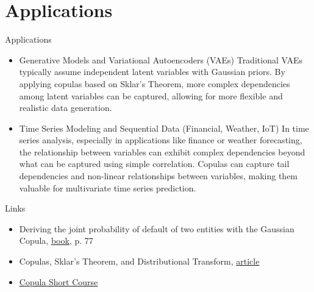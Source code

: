 \documentclass[aspectratio=169, 12pt]{beamer}
\begin{document}
\section{Applications}
\begin{frame}{Applications}
\begin{itemize}
    \item Generative Models and Variational Autoencoders (VAEs)
    Traditional VAEs typically assume independent latent variables with Gaussian priors. By applying copulas based on Sklar’s Theorem, more complex dependencies among latent variables can be captured, allowing for more flexible and realistic data generation.
    \item Time Series Modeling and Sequential Data (Financial, Weather, IoT)
    In time series analysis, especially in applications like finance or weather forecasting, the relationship between variables can exhibit complex dependencies beyond what can be captured using simple correlation. Copulas can capture tail dependencies and non-linear relationships between variables, making them valuable for multivariate time series prediction.
\end{itemize}
    
\end{frame}
\begin{frame}{Links}
    \begin{itemize}
        \item Deriving the joint probability of default of two entities with the Gaussian Copula, \href{https://library .wbi.ac.id/repository/64.pdf}{book}, p. 77
        \item Copulas, Sklar’s Theorem, and Distributional Transform, \href{https://link.springer.com/chapter/10.1007/978-3-642-33590-7_1}{article}
        \item \href{https://www.youtube.com/playlist?list=PLJYjjnnccKYDppALiJlHskU8md904FXgd}{Copula Short Course}
    \end{itemize}
    
    
    
    
\end{frame}
    
\end{document}
